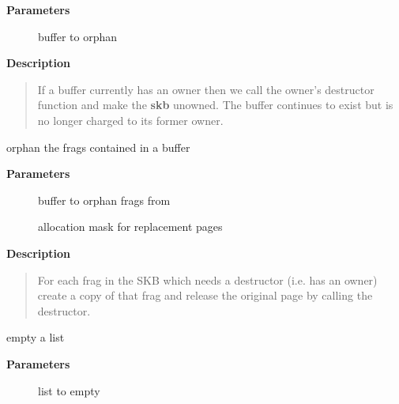 \documentclass[a4paper,8pt,english]{sphinxmanual}
\begin{document}
\textbf{Parameters}
\begin{description}
\item[{}] \leavevmode
buffer to orphan

\end{description}

\textbf{Description}
\begin{quote}

If a buffer currently has an owner then we call the owner's
destructor function and make the \textbf{skb} unowned. The buffer continues
to exist but is no longer charged to its former owner.
\end{quote}

\begin{fulllineitems}
\label{networking/kapi:c.skb_orphan_frags}
orphan the frags contained in a buffer

\end{fulllineitems}


\textbf{Parameters}
\begin{description}
\item[{}] \leavevmode
buffer to orphan frags from

\item[{}] \leavevmode
allocation mask for replacement pages

\end{description}

\textbf{Description}
\begin{quote}

For each frag in the SKB which needs a destructor (i.e. has an
owner) create a copy of that frag and release the original
page by calling the destructor.
\end{quote}

\begin{fulllineitems}
\label{networking/kapi:c.skb_queue_purge}
empty a list

\end{fulllineitems}


\textbf{Parameters}
\begin{description}
\item[{}] \leavevmode
list to empty

\end{description}
\end{document}
